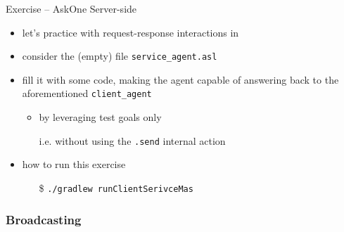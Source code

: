 \documentclass[presentation]{beamer}\mode<presentation>{\usetheme{AMSBolognaFC}}
\begin{document}

\startExercise
\begin{frame}[c, allowframebreaks]{Exercise \currentExercise{} -- AskOne Server-side}
\begin{itemize}
    \item let's practice with request-response interactions in \jason{}
    
    \vspace{.3cm}
    
    \item consider the (empty) file \texttt{service\_agent.asl}
    
    \vspace{.3cm}
    
    \item fill it with some \jason{} code, making the agent capable of answering back to the aforementioned \texttt{client\_agent}
    \begin{itemize}
        \item by leveraging test goals only
        \item[i.e.] without using the \texttt{.send} internal action
    \end{itemize}
    
    \vspace{.3cm}
    
    \item how to run this exercise
    \begin{itemize}
        \item[\$] \texttt{./gradlew run\alert{ClientSerivce}Mas}
    \end{itemize}
    
\end{itemize}
\end{frame}

\subsubsection{Broadcasting}
\end{document}
